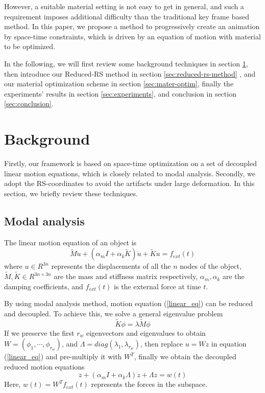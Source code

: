 \documentclass[9pt,twocolumn]{extarticle}
\begin{document}
However, a suitable material setting is not easy to get in general, and such a
requirement imposes additional difficulty than the traditional key frame based
method. In this paper, we propose a method to progressively create an animation
by space-time constraints, which is driven by an equation of motion with
material to be optimized. 

In the following, we will first review some background techniques in section
\ref{sec:background}, then introduce our Reduced-RS method in section
\ref{sec:reduced-rs-method} , and our material optimization scheme in section
\ref{sec:mater-optim}, finally the experiments' results in section
\ref{sec:experiments}, and conclusion in section \ref{sec:conclusion}.

\section{Background}\label{sec:background}
Firstly, our framework is based on space-time optimization on a set of decoupled
linear motion equations, which is closely related to modal analysis. Secondly,
we adopt the RS-coordinates to avoid the artifacts under large deformation. In
this section, we briefly review these techniques.

\subsection{Modal analysis}
The linear motion equation of an object is
\begin{equation} \label{linear_eq}
  \tilde{M}\ddot{u} + (\alpha_mI+\alpha_k\tilde{K})\dot{u} + \tilde{K}u = f_{ext}(t)
\end{equation}
where $u\in R^{3n}$ represents the displacements of all the $n$ nodes of the
object, $\tilde{M},\tilde{K} \in R^{3n\times 3n}$ are the mass and stiffness
matrix respectively, $\alpha_m,\alpha_k$ are the damping coefficients, and
$f_{ext}(t)$ is the external force at time $t$.

By using modal analysis method, motion equation (\ref{linear_eq}) can be reduced
and decoupled. To achieve this, we solve a general eigenvalue problem
\begin{equation} \label{general_eig}
  \tilde{K}\phi = \lambda \tilde{M}\phi
\end{equation}
If we preserve the first $r_w$ eigenvectors and eigenvalues to obtain
$W=(\phi_1,\cdots,\phi_{r_w})$, and $\Lambda=diag(\lambda_1,\lambda_{r_w})$,
then replace $u=Wz$ in equation (\ref{linear_eq}) and pre-multiply it with
$W^T$, finally we obtain the decoupled reduced motion equations
\begin{equation} \label{ma_eq}
  \ddot{z} + (\alpha_mI+\alpha_k\Lambda)\dot{z} + \Lambda{z} = w(t)
\end{equation}
Here, $w(t)=W^Tf_{ext}(t)$ represents the forces in the subspace.
\end{document}
